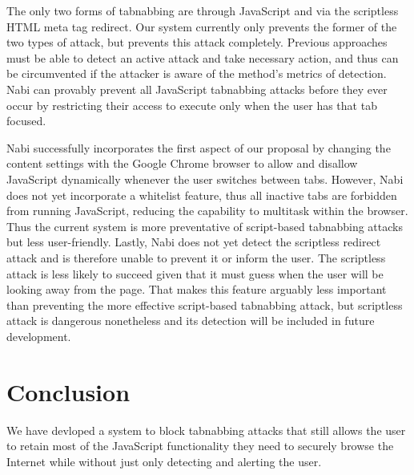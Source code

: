 \documentclass[12pt]{article}
\begin{document}
\begin{doublespace}
The only two forms of tabnabbing are through JavaScript and via the scriptless HTML meta tag redirect. Our system currently only prevents the former of the two types of attack, but prevents this attack completely. Previous approaches must be able to detect an active attack and take necessary action, and thus can be circumvented if the attacker is aware of the method's metrics of detection. Nabi can provably prevent all JavaScript tabnabbing attacks before they ever occur by restricting their access to execute only when the user has that tab focused.

Nabi successfully incorporates the first aspect of our proposal by changing the content settings with the Google Chrome browser to allow and disallow JavaScript dynamically whenever the user switches between tabs. However, Nabi does not yet incorporate a whitelist feature, thus all inactive tabs are forbidden from running JavaScript, reducing the capability to multitask within the browser. Thus the current system is more preventative of script-based tabnabbing attacks but less user-friendly. Lastly, Nabi does not yet detect the scriptless redirect attack and is therefore unable to prevent it or inform the user. The scriptless attack is less likely to succeed given that it must guess when the user will be looking away from the page. That makes this feature arguably less important than preventing the more effective script-based tabnabbing attack, but scriptless attack is dangerous nonetheless and its detection will be included in future development.

\section{Conclusion}

We have devloped a system to block tabnabbing attacks that still allows the user to retain most of the JavaScript functionality they need to securely browse the Internet while without just only detecting and alerting the user. 


\end{doublespace}




\end{document}
